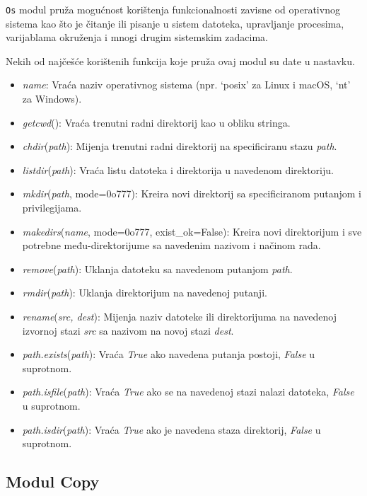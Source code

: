 \texttt{Os} modul   pruža mogućnost korištenja funkcionalnosti zavisne od opera\-tivnog sistema kao što je čitanje ili pisanje u sistem datoteka, upravljanje procesima, varijablama okruženja i mnogi drugim sistemskim zadacima.

Nekih od najčešće korištenih funkcija koje pruža ovaj modul su date u nastavku.

\begin{itemize}
	\item \textit{name}: Vraća naziv operativnog sistema (npr. `posix' za Linux i macOS, `nt' za Windows).
	\item  \textit{getcwd}(): Vraća trenutni radni direktorij kao u obliku stringa.
	\item  \textit{chdir}(\emph{path}): Mijenja trenutni radni direktorij na specificiranu stazu \emph{path}.
	\item \textit{listdir}(\emph{path}): Vraća listu datoteka i direktorija u navedenom direktoriju.
	\item \textit{mkdir}(\emph{path}, mode=0o777): Kreira novi direktorij sa specificiranom putanjom i privilegijama.
	\item \textit{makedirs}(\textit{name}, mode=0o777, exist\_ok=False): Kreira novi direkto\-rijum i sve potrebne među-direktorijume sa navedenim nazivom i načinom rada.
	\item \textit{remove}(\emph{path}): Uklanja datoteku sa navedenom putanjom \emph{path}.
	\item \textit{rmdir}(\emph{path}): Uklanja direktorijum na navedenoj putanji.
	\item \textit{rename}(\emph{src, dest}): Mijenja naziv datoteke ili direktorijuma na navedenoj izvornoj stazi \emph{src} sa nazivom na novoj stazi \emph{dest}.
	\item \textit{path.exists}(\emph{path}): Vraća \emph{True} ako navedena putanja postoji, \emph{False} u suprotnom.
	\item \textit{path.isfile}(\emph{path}): Vraća \emph{True} ako se na navedenoj stazi nalazi datoteka, \emph{False} u suprotnom.
	\item \textit{path.isdir}(\emph{path}): Vraća \emph{True} ako je navedena staza direktorij, \emph{False} u suprotnom.
  
\end{itemize}

\subsection{Modul Copy}

